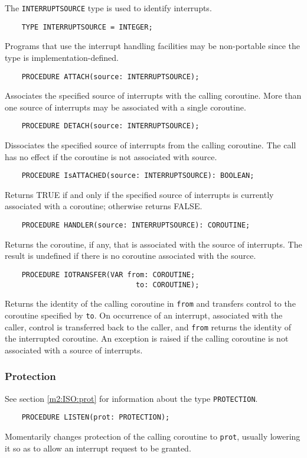 The {\tt INTERRUPTSOURCE} type is used to identify interrupts.

\verb'    TYPE INTERRUPTSOURCE = INTEGER;'

Programs that use the interrupt handling facilities may be non-portable
since the type is implementation-defined.

\verb'    PROCEDURE ATTACH(source: INTERRUPTSOURCE);'

Associates the specified source of interrupts with the calling
coroutine. More than one source of interrupts may be associated
with a single coroutine.

\verb'    PROCEDURE DETACH(source: INTERRUPTSOURCE);'

Dissociates the specified source of interrupts from the calling
coroutine. The call has no effect if the coroutine is not associated
with source.

\verb'    PROCEDURE IsATTACHED(source: INTERRUPTSOURCE): BOOLEAN;'

Returns TRUE if and only if the specified source of interrupts is
currently associated with a coroutine; otherwise returns FALSE.

\verb'    PROCEDURE HANDLER(source: INTERRUPTSOURCE): COROUTINE;'

Returns the coroutine, if any, that is associated with the source
of  interrupts.  The result is undefined if there is no coroutine
associated with the source.

\verb'    PROCEDURE IOTRANSFER(VAR from: COROUTINE;'\\
\verb'                               to: COROUTINE);'

Returns the identity of the calling coroutine in {\tt from} and
transfers control to the coroutine specified by {\tt to}. On
occurrence of an interrupt, associated with the caller, control is
transferred back to the caller, and {\tt from} returns the identity
of the interrupted coroutine. An exception is raised if the calling
coroutine is not associated with a source of interrupts.

\subsubsection{Protection}\label{m2:ISO:coroutines:prot}

See section \ref{m2:ISO:prot} for information about the type \verb'PROTECTION'.

\verb'    PROCEDURE LISTEN(prot: PROTECTION);'

Momentarily changes protection of the calling coroutine to {\tt prot},
usually lowering it so as to allow an interrupt request to be granted.

